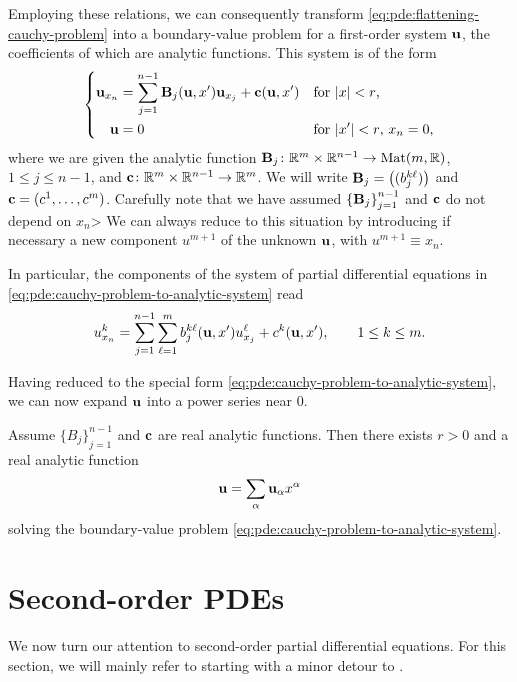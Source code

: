 Employing these relations, we can consequently transform
\eqref{eq:pde:flattening-cauchy-problem} into a boundary-value problem for
a first-order system \(\mathbf{u}\), the coefficients of which are analytic
functions. This system is of the form
\begin{equation}
  \label{eq:pde:cauchy-problem-to-analytic-system}
  \left\{
    \begin{aligned}
      \mathbf{u}_{x_n}&=\sum_{j=1}^{n-1}\mathbf{B}_j(\mathbf{u},x')\mathbf{u}_{x_j}+\mathbf{c}(\mathbf{u},x')
      &&\text{for \(|x|<r\),}\\
      \mathbf{u}&=0&&\text{for \(|x'|<r\), \(x_n=0\),}
    \end{aligned}
  \right.
\end{equation}
where we are given the analytic function
\(\mathbf{B}_j\colon\mathbb{R}^m\times\mathbb{R}^{n-1}\to\operatorname{Mat}(m,\mathbb{R})\), \(1\leq j\leq n-1\),
and \(\mathbf{c}\colon\mathbb{R}^{m}\times\mathbb{R}^{n-1}\to\mathbb{R}^m\). We will write
\(\mathbf{B}_j=\bigl((b_j^{k\ell})\bigr)\) and
\(\mathbf{c}=(c^1,\dotsc,c^m)\). Carefully note that we have assumed
\({\{\mathbf{B}_j\}}_{j=1}^{n-1}\) and \(\mathbf{c}\) do not depend on \(x_n\)> We can
always reduce to this situation by introducing if necessary a new
component \(u^{m+1}\) of the unknown \(\mathbf{u}\), with \(u^{m+1}\equiv x_n\).

In particular, the components of the system of partial differential
equations in \eqref{eq:pde:cauchy-problem-to-analytic-system} read
\begin{equation}
  \label{eq:cauchy-problem-to-analytic-system-comps}
  u_{x_n}^k=\sum_{j=1}^{n-1}\sum_{\ell=1}^m b_j^{k\ell}(\mathbf{u},x')u_{x_j}^\ell
  +c^k(\mathbf{u},x'),\qquad 1\leq k\leq m.
\end{equation}

Having reduced to the special form
\eqref{eq:pde:cauchy-problem-to-analytic-system}, we can now expand
\(\mathbf{u}\) into a power series near \(0\).

\begin{theorem}
  Assume \({\{B_j\}}_{j=1}^{n-1}\) and \(\mathbf{c}\) are real analytic
  functions. Then there exists \(r>0\) and a real analytic function
  \begin{equation}
    \label{eq:pde:cauchy-kovalevskaya-solution}
    \mathbf{u}=\sum_\alpha\mathbf{u}_\alpha x^\alpha
  \end{equation}
  solving the boundary-value problem
  \eqref{eq:pde:cauchy-problem-to-analytic-system}.
\end{theorem}

\section{Second-order PDEs}
We now turn our attention to second-order partial differential
equations. For this section, we will mainly refer to \cite[\S 3]{john}
starting with a minor detour to \cite[\S 7.2.5]{evans}.

